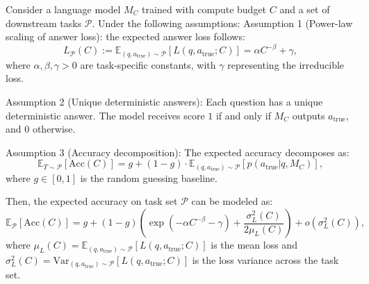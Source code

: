 \begin{theorem}
\label{supp:proof:task_scaling_law}
Consider a language model $M_C$ trained with compute budget $C$ and a set of downstream tasks $\mathcal{P}$. Under the following assumptions:
Assumption 1 (Power-law scaling of answer loss): the expected answer loss follows:
\begin{equation}
L_{\mathcal{P}}(C) := \mathbb{E}_{(q,a_{\text{true}}) \sim \mathcal{P}}[L(q, a_{\text{true}}; C)] = \alpha C^{-\beta} + \gamma,
\end{equation}
where $\alpha, \beta, \gamma > 0$ are task-specific constants, with $\gamma$ representing the irreducible loss.

Assumption 2 (Unique deterministic answers): Each question has a unique deterministic answer. The model receives score $1$ if and only if $M_C$ outputs $a_{\text{true}}$, and $0$ otherwise.

Assumption 3 (Accuracy decomposition): The expected accuracy decomposes as:
\begin{equation}
\mathbb{E}_{T \sim \mathcal{P}}[\mathrm{Acc}(C)] = g + (1-g) \cdot \mathbb{E}_{(q,a_{\text{true}}) \sim \mathcal{P}}[p(a_{\text{true}}|q, M_C)],
\end{equation}
where $g \in [0,1]$ is the random guessing baseline.

Then, the expected accuracy on task set $\mathcal{P}$ can be modeled as:
\begin{equation}
\mathbb{E}_{\mathcal{P}}[\mathrm{Acc}(C)] = g+(1-g)\left(\exp{(-\alpha C^{-\beta}-\gamma)} + \frac{\sigma_L^2(C)}{2\mu_L(C)} \right)+ o\left(\sigma_L^2(C)\right),
\end{equation}
where $\mu_L(C) = \mathbb{E}_{(q,a_{\text{true}}) \sim \mathcal{P}}[L(q, a_{\text{true}}; C)]$ is the mean loss and $\sigma_L^2(C) = \mathrm{Var}_{(q,a_{\text{true}}) \sim \mathcal{P}}[L(q, a_{\text{true}}; C)]$ is the loss variance across the task set.
\end{theorem}

